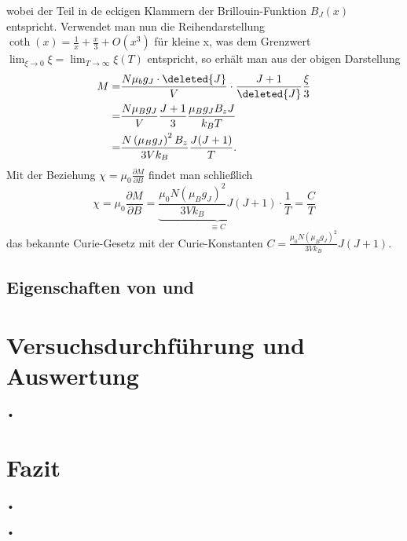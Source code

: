 \documentclass[twoside,colorback,accentcolor=tud4c,11pt]{tudreport}
\begin{document}
wobei der Teil in de eckigen Klammern der Brillouin-Funktion $B_{J}(x)$ entspricht. Verwendet man nun die Reihendarstellung $\coth (x)=\frac{1}{x}+\frac{x}{3}+O(x^3)$ für kleine x, was dem Grenzwert $\lim_{\xi\to0}\xi=\lim_{T\to \infty}\xi (T)$ entspricht, so erhält man aus der obigen Darstellung
\begin{align}
M=&\frac{N\mu_{b}g_{J}\cdot \deleted{J}}{V}\cdot\frac{J+1}{\deleted{J}}\frac{\xi}{3}\\
=&\frac{N\mu_{B}g_{J}}{V}\frac{J+1}{3}\frac{\mu_{B}g_{J}B_{z}J}{k_{B}T}\\
=&\frac{N\left(\mu_{B}g_{J}\right)^2B_{z}}{3Vk_{B}}\frac{J(J+1)}{T}.
\end{align}
Mit der Beziehung $\chi=\mu_{0}\frac{\partial M}{\partial B}$ findet man schließlich
\begin{equation}
\chi=\mu_{0}\frac{\partial M}{\partial B}=\underbrace{\frac{\mu_{0}N\left(\mu_{B}g_{J}\right)^2}{3Vk_{B}}J(J+1)}_{\equiv C}\cdot\frac{1}{T}=\frac{C}{T}
\end{equation}
das bekannte Curie-Gesetz mit der Curie-Konstanten $C=\frac{\mu_{0}N\left(\mu_{B}g_{J}\right)^2}{3Vk_{B}}J(J+1)$.
\section{Eigenschaften von  und }
\chapter{Versuchsdurchführung und Auswertung}
•
\chapter{Fazit}	
•
\renewcommand{\bibname}{Literatur}
\begin{thebibliography}{0}
 •

\end{thebibliography}
\end{document}

